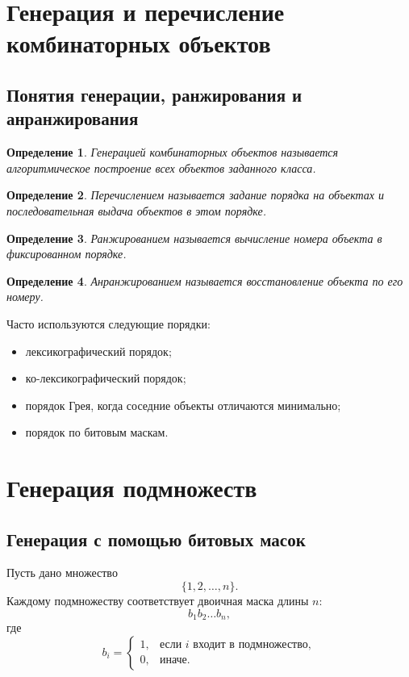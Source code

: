 \documentclass[12pt,a4paper]{article}
\newtheorem{definition}{Определение}
\begin{document}
\section{Генерация и перечисление комбинаторных объектов}

\subsection{Понятия генерации, ранжирования и анранжирования}

\begin{definition}
Генерацией комбинаторных объектов называется алгоритмическое построение всех объектов заданного класса.
\end{definition}

\begin{definition}
Перечислением называется задание порядка на объектах и последовательная выдача объектов в этом порядке.
\end{definition}

\begin{definition}
Ранжированием называется вычисление номера объекта в фиксированном порядке.
\end{definition}

\begin{definition}
Анранжированием называется восстановление объекта по его номеру.
\end{definition}

Часто используются следующие порядки:
\begin{itemize}
    \item лексикографический порядок;
    \item ко-лексикографический порядок;
    \item порядок Грея, когда соседние объекты отличаются минимально;
    \item порядок по битовым маскам.
\end{itemize}

\section{Генерация подмножеств}

\subsection{Генерация с помощью битовых масок}

Пусть дано множество
\[
\{1,2,\dots,n\}.
\]
Каждому подмножеству соответствует двоичная маска длины $n$:
\[
b_1b_2\dots b_n,
\]
где
\[
b_i =
\begin{cases}
1, & \text{если } i \text{ входит в подмножество},\\
0, & \text{иначе}.
\end{cases}
\]
\end{document}
